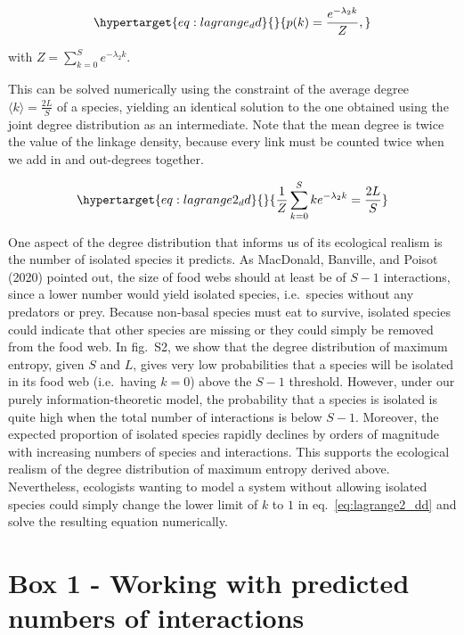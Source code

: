 \documentclass[10pt,oneside]{article}
\begin{document}
\begin{equation}\protect\hypertarget{eq:lagrange_dd}{}{p(k) = \frac{e^{-\lambda_2k}}{Z},}\label{eq:lagrange_dd}\end{equation}

with \(Z = \sum_{k=0}^S e^{-\lambda_2k}.\)

This can be solved numerically using the constraint of the average
degree \(\langle k \rangle = \frac{2L}{S}\) of a species, yielding an
identical solution to the one obtained using the joint degree
distribution as an intermediate. Note that the mean degree is twice the
value of the linkage density, because every link must be counted twice
when we add in and out-degrees together.

\begin{equation}\protect\hypertarget{eq:lagrange2_dd}{}{\frac{1}{Z}\sum_{k=0}^S k e^{-\lambda_2k} = \frac{2L}{S}}\label{eq:lagrange2_dd}\end{equation}

One aspect of the degree distribution that informs us of its ecological
realism is the number of isolated species it predicts. As MacDonald,
Banville, and Poisot (2020) pointed out, the size of food webs should at
least be of \(S-1\) interactions, since a lower number would yield
isolated species, i.e.~species without any predators or prey. Because
non-basal species must eat to survive, isolated species could indicate
that other species are missing or they could simply be removed from the
food web. In fig.~S2, we show that the degree distribution of maximum
entropy, given \(S\) and \(L\), gives very low probabilities that a
species will be isolated in its food web (i.e.~having \(k = 0\)) above
the \(S-1\) threshold. However, under our purely information-theoretic
model, the probability that a species is isolated is quite high when the
total number of interactions is below \(S-1\). Moreover, the expected
proportion of isolated species rapidly declines by orders of magnitude
with increasing numbers of species and interactions. This supports the
ecological realism of the degree distribution of maximum entropy derived
above. Nevertheless, ecologists wanting to model a system without
allowing isolated species could simply change the lower limit of \(k\)
to \(1\) in eq.~\ref{eq:lagrange2_dd} and solve the resulting equation
numerically.

\hypertarget{box-1---working-with-predicted-numbers-of-interactions}{%
\section{Box 1 - Working with predicted numbers of
interactions}\label{box-1---working-with-predicted-numbers-of-interactions}}
\end{document}
